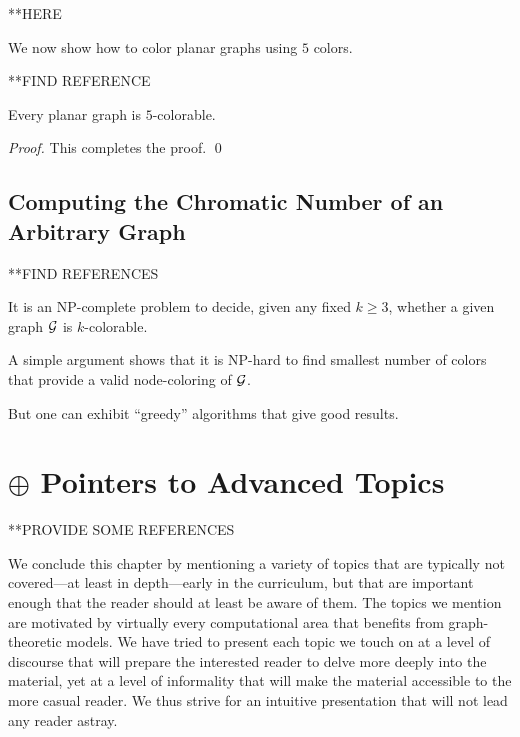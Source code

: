 \bigskip

**HERE

We 
now show how to color planar graphs using $5$ colors.

**FIND REFERENCE

\begin{prop}
\label{thm:P-5-colorability}
Every planar graph is $5$-colorable.
\end{prop}

\begin{proof}

This completes the proof.
\qed
\end{proof}


\subsection{Computing the Chromatic Number of an Arbitrary Graph}
\label{sec:Compute-Chromatic-No}

**FIND REFERENCES

It is an {\sf NP}-complete problem to decide, given any fixed $k \geq
3$, whether a given graph $\mbox{$\cal G$}$ is $k$-colorable.

A simple argument shows that it is {\sf NP}-hard to find smallest
number of colors that provide a valid node-coloring of $\mbox{$\cal G$}$.

But one can exhibit ``greedy'' algorithms that give good results.



\section{$\oplus$ Pointers to Advanced Topics}
\label{sec:advanced-topics}

**PROVIDE SOME REFERENCES

We conclude this chapter by mentioning a variety of topics that are
typically not covered---at least in depth---early in the curriculum,
but that are important enough that the reader should at least be aware
of them.  The topics we mention are motivated by virtually every
computational area that benefits from graph-theoretic models.  We have
tried to present each topic we touch on at a level of discourse that
will prepare the interested reader to delve more deeply into the
material, yet at a level of informality that will make the material
accessible to the more casual reader.  We thus strive for an intuitive
presentation that will not lead any reader astray.


